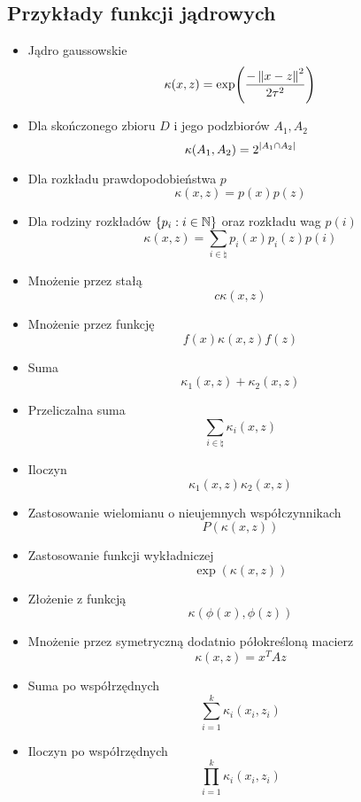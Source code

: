 \subsection{Przykłady funkcji jądrowych}
\begin{itemize}
    \item Jądro gaussowskie
    \[
        \kappa(x, z) = \exp\pars{\frac{-\norm{x - z}^2}{2\tau^2}}
    \]
    \item Dla skończonego zbioru \( D \) i jego podzbiorów \( A_1, A_2 \)
    \[
        \kappa(A_1, A_2) = 2^{\card{A_1 \cap A_2}}
    \]
    \item Dla rozkładu prawdopodobieństwa \( p \)
    \[
        \kappa(x, z) = p(x)p(z)
    \]
    \item Dla rodziny rozkładów \( \set{p_i : i \in \natural} \) oraz rozkładu wag \( p(i) \)
    \[
        \kappa(x, z) = \sum_{i \in \natural} p_i(x)p_i(z)p(i)
    \]
    \item Mnożenie przez stałą
    \[
        c\kappa(x, z)
    \]
    \item Mnożenie przez funkcję 
    \[
        f(x)\kappa(x, z)f(z)
    \]
    \item Suma
    \[
        \kappa_1(x, z) + \kappa_2(x, z)
    \]
    \item Przeliczalna suma
    \[
        \sum_{i \in \natural} \kappa_i(x, z)
    \]
    \item Iloczyn
    \[
        \kappa_1(x, z) \kappa_2(x, z)
    \]
    \item Zastosowanie wielomianu o nieujemnych współczynnikach
    \[
        P(\kappa(x, z))
    \]
    \item Zastosowanie funkcji wykładniczej
    \[
        \exp(\kappa(x, z))
    \]
    \item Złożenie z funkcją
    \[
        \kappa(\phi(x), \phi(z))
    \]
    \item Mnożenie przez symetryczną dodatnio półokreśloną macierz
    \[
        \kappa(x, z) = x^TAz
    \]
    \item Suma po współrzędnych
    \[
        \sum_{i=1}^k \kappa_i(x_i, z_i)
    \]
    \item Iloczyn po współrzędnych
    \[
        \prod_{i=1}^k \kappa_i(x_i, z_i)
    \]
\end{itemize}